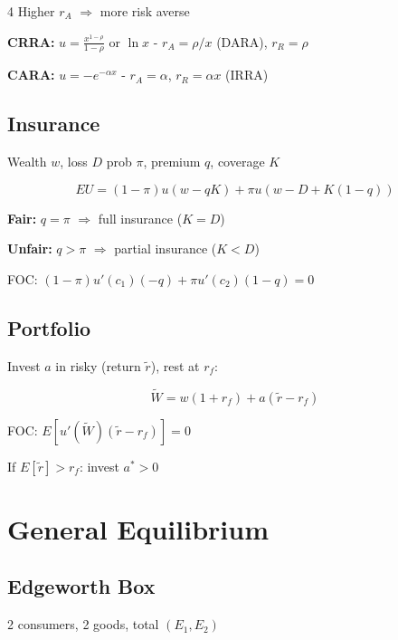 \documentclass[8pt,landscape]{article}
\begin{document}
\begin{multicols}{4}
Higher $r_A$ $\Rightarrow$ more risk averse

\textbf{CRRA:} $u = \frac{x^{1-\rho}}{1-\rho}$ or $\ln x$
- $r_A = \rho/x$ (DARA), $r_R = \rho$

\textbf{CARA:} $u = -e^{-\alpha x}$
- $r_A = \alpha$, $r_R = \alpha x$ (IRRA)

\subsection{Insurance}
Wealth $w$, loss $D$ prob $\pi$, premium $q$, coverage $K$

$$EU = (1-\pi)u(w-qK) + \pi u(w-D+K(1-q))$$

\textbf{Fair:} $q = \pi$ $\Rightarrow$ full insurance ($K = D$)

\textbf{Unfair:} $q > \pi$ $\Rightarrow$ partial insurance ($K < D$)

FOC: $(1-\pi)u'(c_1)(-q) + \pi u'(c_2)(1-q) = 0$

\subsection{Portfolio}
Invest $a$ in risky (return $\tilde{r}$), rest at $r_f$:

$$\tilde{W} = w(1 + r_f) + a(\tilde{r} - r_f)$$

FOC: $E[u'(\tilde{W})(\tilde{r} - r_f)] = 0$

If $E[\tilde{r}] > r_f$: invest $a^* > 0$

\section{General Equilibrium}

\subsection{Edgeworth Box}
2 consumers, 2 goods, total $(E_1, E_2)$

\begin{center}
\end{center}


\end{multicols}
\end{document}
